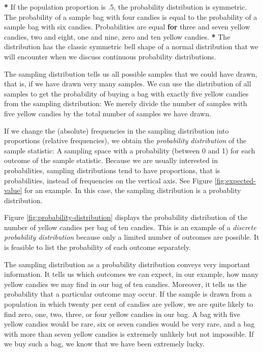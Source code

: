 \documentclass[a4paper]{book}
\newenvironment{Shaded}{\begin{snugshade}}{\end{snugshade}}
\newcommand{\DecValTok}[1]{\textcolor[rgb]{0.00,0.00,0.00}{#1}}
\newcommand{\StringTok}[1]{\textcolor[rgb]{0.00,0.00,0.00}{#1}}
\newcommand{\ControlFlowTok}[1]{\textcolor[rgb]{0.00,0.00,0.00}{\textbf{#1}}}
\newcommand{\OperatorTok}[1]{\textcolor[rgb]{0.00,0.00,0.00}{\textbf{#1}}}
\newcommand{\NormalTok}[1]{#1}
\theoremstyle{definition}
\theoremstyle{definition}
\theoremstyle{definition}
\theoremstyle{remark}
\begin{document}
\begin{Shaded}
\begin{Highlighting}[]
\OperatorTok{*}\StringTok{ }\NormalTok{If the population proportion is .}\DecValTok{5}\NormalTok{, the probability distribution is}
\NormalTok{symmetric. The probability of a sample bag with four candies is equal to the}
\NormalTok{probability of a sample bag with six candies. Probabilities are equal }\ControlFlowTok{for}
\NormalTok{three and seven yellow candies, two and eight, one and nine, zero and ten}
\NormalTok{yellow candies.}
\OperatorTok{*}\StringTok{ }\NormalTok{The distribution has the classic symmetric bell shape of a normal}
\NormalTok{distribution that we will encounter when we discuss continuous probability}
\NormalTok{distributions.}
\end{Highlighting}
\end{Shaded}

The sampling distribution tells us all possible samples that we could
have drawn, that is, if we have drawn very many samples. We can use the
distribution of all samples to get the probability of buying a bag with
exactly five yellow candies from the sampling distribution: We merely
divide the number of samples with five yellow candies by the total
number of samples we have drawn.

If we change the (absolute) frequencies in the sampling distribution
into proportions (relative frequencies), we obtain the \emph{probability
distribution} of the sample statistic: A sampling space with a
probability (between 0 and 1) for each outcome of the sample statistic.
Because we are usually interested in probabilities, sampling
distributions tend to have proportions, that is probabilities, instead
of frequencies on the vertical axis. See Figure \ref{fig:expected-value}
for an example. In this case, the sampling distribution is a probablity
distribution.

Figure \ref{fig:probability-distribution} displays the probability
distribution of the number of yellow candies per bag of ten candies.
This is an example of a \emph{discrete probability distribution} because
only a limited number of outcomes are possible. It is feasible to list
the probability of each outcome separately.

The sampling distribution as a probability distribution conveys very
important information. It tells us which outcomes we can expect, in our
example, how many yellow candies we may find in our bag of ten candies.
Moreover, it tells us the probability that a particular outcome may
occur. If the sample is drawn from a population in which twenty per cent
of candies are yellow, we are quite likely to find zero, one, two,
three, or four yellow candies in our bag. A bag with five yellow candies
would be rare, six or seven candies would be very rare, and a bag with
more than seven yellow candies is extremely unlikely but not impossible.
If we buy such a bag, we know that we have been extremely lucky.
\end{document}
